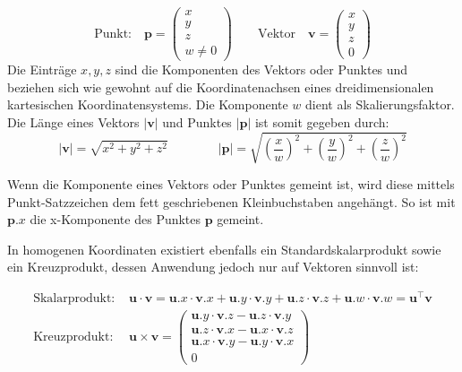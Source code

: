 \begin{equation*}
\text{Punkt:} \quad \boldsymbol{p} = \begin{pmatrix}
        x \\ y \\ z \\ w \ne 0
\end{pmatrix}
\qquad
\text{Vektor} \quad \boldsymbol{v} = \begin{pmatrix}
    x \\ y \\ z \\ 0
\end{pmatrix}
\end{equation*}
Die Einträge \(x, y, z\) sind die Komponenten des Vektors oder Punktes und beziehen sich wie gewohnt auf die Koordinatenachsen eines dreidimensionalen kartesischen Koordinatensystems. Die Komponente \(w\) dient als Skalierungsfaktor. Die Länge eines Vektors \( |\boldsymbol{v}| \) und Punktes \( |\boldsymbol{p}| \) ist somit gegeben durch:
\begin{equation*}
|\boldsymbol{v}| = \sqrt{x^2+y^2+z^2} \quad \quad \quad \quad
|\boldsymbol{p}| = \sqrt{\left(\frac{x}{w} \right)^2
                         + \left(\frac{y}{w}\right)^2 
                         + \left(\frac{z}{w}\right)^2
                        }
\end{equation*}

Wenn die Komponente eines Vektors oder Punktes gemeint ist, wird diese mittels Punkt-Satzzeichen dem fett geschriebenen Kleinbuchstaben angehängt. So ist mit \( \boldsymbol{p}.x \) die x-Komponente des Punktes \( \boldsymbol{p} \) gemeint.

In homogenen Koordinaten existiert ebenfalls ein Standardskalarprodukt sowie ein Kreuzprodukt, dessen Anwendung jedoch nur auf Vektoren sinnvoll ist:

\begin{align}
   \text{Skalarprodukt: }& \boldsymbol{u} \cdot \boldsymbol{v} = \boldsymbol{u}.x \cdot \boldsymbol{v}.x +  \boldsymbol{u}.y \cdot \boldsymbol{v}.y + \boldsymbol{u}.z \cdot \boldsymbol{v}.z + \boldsymbol{u}.w \cdot \boldsymbol{v}.w = \boldsymbol{u}^\intercal \boldsymbol{v} \label{eq:skalarprodukt} \\
   \text{Kreuzprodukt: }& \boldsymbol{u} \times \boldsymbol{v} = 
   \begin{pmatrix}
   \boldsymbol{u}.y \cdot \boldsymbol{v}.z - \boldsymbol{u}.z \cdot \boldsymbol{v}.y \\
   \boldsymbol{u}.z \cdot \boldsymbol{v}.x - \boldsymbol{u}.x \cdot \boldsymbol{v}.z \\
   \boldsymbol{u}.x \cdot \boldsymbol{v}.y - \boldsymbol{u}.y \cdot \boldsymbol{v}.x \\
   0
   \end{pmatrix}
\end{align}

